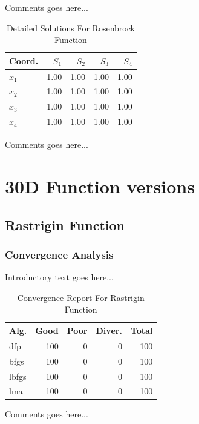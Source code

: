 \documentclass{ieeeaccess}
\begin{document}
Comments goes here...
\begin{table}
\centering
\caption{Detailed Solutions For Rosenbrock Function}
\label{detailedsolutions:rosenbrock4d}
\begin{tabular}{lrrrr}
\toprule
 Coord. &  $S_{1}$ &  $S_{2}$ &  $S_{3}$ &  $S_{4}$ \\
\midrule
$x_{1}$ &     1.00 &     1.00 &     1.00 &     1.00 \\
$x_{2}$ &     1.00 &     1.00 &     1.00 &     1.00 \\
$x_{3}$ &     1.00 &     1.00 &     1.00 &     1.00 \\
$x_{4}$ &     1.00 &     1.00 &     1.00 &     1.00 \\
\bottomrule
\end{tabular}
\end{table}


Comments goes here...

\section{30D Function versions}
\label{functions30D}

\subsection{Rastrigin Function}
\label{rastrigin30d30D}

\subsubsection{Convergence Analysis}
\label{convergencerastrigin30d30D}


Introductory text goes here...
\begin{table}
\centering
\caption{Convergence Report For Rastrigin Function}
\label{convergence:rastrigin30d}
\begin{tabular}{lrrrr}
\toprule
 Alg. &  Good &  Poor &  Diver. &  Total \\
\midrule
  dfp &   100 &     0 &       0 &    100 \\
 bfgs &   100 &     0 &       0 &    100 \\
lbfgs &   100 &     0 &       0 &    100 \\
  lma &   100 &     0 &       0 &    100 \\
\bottomrule
\end{tabular}
\end{table}


Comments goes here...
\end{document}
